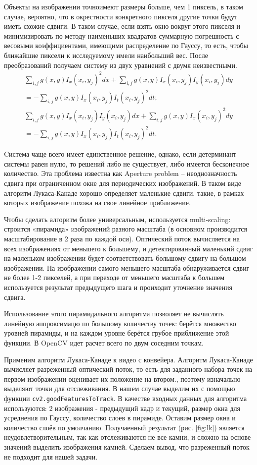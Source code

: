 \documentclass[times]{itmo-student-thesis}
\begin{document}
Объекты на изображении точноимеют размеры больше, чем 1 пиксель, в таком случае, вероятно, что в окрестности конкретного пикселя другие точки будут иметь схожие сдвиги. В таком случае, если взять окно вокруг этого пикселя и минимизировать по методу наименьших квадратов суммарную погрешность с весовыми коэффициентами, имеющими распределение по Гауссу, то есть, чтобы ближайшие пиксели к исследуемому имели наибольший вес. После преобразований получаем систему из двух уравнений с двумя неизвестными.
\begin{eqnarray}
\sum_{i, j} g(x, y) I_x(x_i, y_j )^2 dx + \sum_{i, j} g(x, y) I_x(x_i, y_j ) I_y(x_i, y_j ) dy 
\nonumber \\  = - \sum_{i, j} g(x, y) I_x(x_i, y_j ) I_t(x_i, y_j )^2 dt;  \\
\sum_{i, j} g(x, y) I_x(x_i, y_j ) I_y(x_i, y_j ) dx + \sum_{i, j} g(x, y) I_x(x_i, y_j )^2 dy \nonumber
\\ = - \sum_{i, j} g(x, y) I_x(x_i, y_j ) I_t(x_i, y_j )^2 dt.
\end{eqnarray}

Cистема чаще всего имеет единственное решение, однако, если детерминант системы равен нулю, то решений либо не существует, либо имеется бесконечное количество. Эта проблема известна как Aperture problem – неоднозначность сдвига при ограниченном окне для периодических изображений. В таком виде алгоритм Лукаса-Канаде хорошо определяет маленькие сдвиги, такие, в рамках которых изображение похожа на свое линейное приближение. 

Чтобы сделать алгоритм более универсальным, используется multi-scaling: строится «пирамида» изображений разного масштаба (в основном производится масштабирование в 2 раза по каждой оси). Оптический поток вычисляется на всех изображениях от меньшего к большему, и  детектированный маленький сдвиг на маленьком изображении будет соответствовать большому сдвигу на большом изображении. На изображении самого меньшего масштаба обнаруживается сдвиг не более 1-2 пикселей, а при переходе от меньшего масштаба к большем  используется результат предыдущего шага и проиходит уточнение значения сдвига. 

Использование этого пирамидального алгоритма позволяет не вычислять линейную аппроксимацю по большому количеству точек: берётся множество уровней пирамиды, и на каждом уровне берётся грубое приближение этой функции. В OpenCV  идет расчет всего по двум соседним точкам. 

Применим  алгоритм Лукаса-Канаде к видео с конвейера. Алгоритм Лукаса-Канаде вычисляет разреженный оптический поток, то есть для заданного набора точек на первом изображении оценивает их положение на втором., поэтому изначально выделяют точки для отслеживания. В нашем случае выделим их с помощью функции \texttt{cv2.goodFeaturesToTrack}. В качестве входных данных для алгоритма используются: 2 изображения - предыдущий кадр и текущий, размер окна для усреднения по Гауссу, количество слоев в пирамиде. Оставим размер окна и количество слоёв по умолчанию. Получаенный результат (рис. \ref{fig:lk}) является неудовлетворительным, так как отслеживаются не все камни, и сложно на основе значений выделить изображения камней. Сделаем вывод, что разреженный поток не подходит для нашей задачи.
\end{document}
